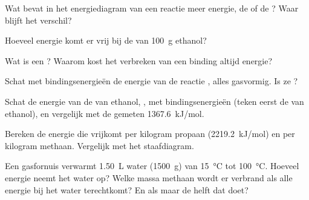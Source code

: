 \begin{exercise}[$\star$]\label{exo:g11:reaction-energy:3}
Wat bevat in het energiediagram van een  reactie meer energie,
de  of de ? Waar blijft het verschil?
\end{exercise}

\begin{exercise}[$\star$]\label{exo:g11:reaction-energy:4}
Hoeveel energie komt er vrij bij de  van
\qty{100}{g} ethanol?
\end{exercise}

\begin{exercise}[$\star$]\label{exo:g11:reaction-energy:5}
Wat is een ? Waarom kost het verbreken van een binding
altijd energie?
\end{exercise}

\begin{exercise}[$\star\star$]\label{exo:g11:reaction-energy:6}
Schat met bindingsenergieën de energie van de reactie
, alles gasvormig. Is ze ?
\end{exercise}

\begin{exercise}[$\star\star$]\label{exo:g11:reaction-energy:7}
Schat de energie van de  van ethanol, , met bindingsenergieën (teken eerst de  van
ethanol), en vergelijk met de gemeten \qty{1367.6}{kJ/mol}.
\end{exercise}

\begin{exercise}[$\star\star$]\label{exo:g11:reaction-energy:8}
Bereken de energie die vrijkomt per kilogram propaan
(\qty{2219.2}{kJ/mol}) en per kilogram methaan. Vergelijk met het
staafdiagram.
\end{exercise}

\begin{exercise}[$\star\star$]\label{exo:g11:reaction-energy:9}
Een gasfornuis verwarmt \qty{1.50}{L} water (\qty{1500}{g}) van
\qty{15}{\celsius} tot \qty{100}{\celsius}. Hoeveel energie neemt het
water op? Welke massa methaan wordt er verbrand als alle energie bij het
water terechtkomt? En als maar de helft dat doet?
\end{exercise}

